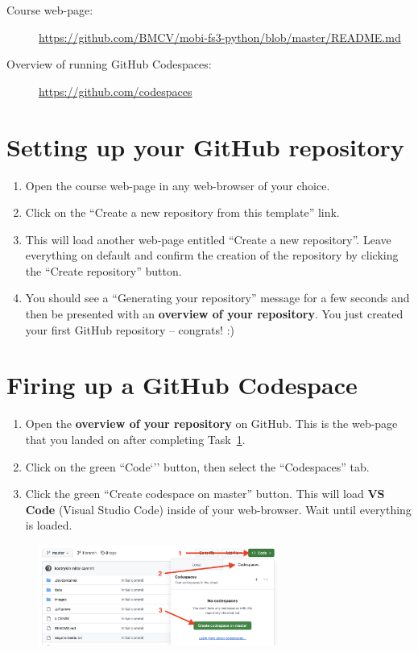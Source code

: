 \documentclass[12pt,a4paper]{article}
\begin{document}
\begin{description}
\item[Course web-page:] \begin{sloppypar}\url{https://github.com/BMCV/mobi-fs3-python/blob/master/README.md}\end{sloppypar}
\item[Overview of running GitHub Codespaces:] \url{https://github.com/codespaces}
\end{description}

\section{Setting up your GitHub repository}
\label{task:preparation}
\begin{enumerate}
\item Open the course web-page in any web-browser of your choice.
\item Click on the ``Create a new repository from this template'' link.
\item This will load another web-page entitled ``Create a new repository''. Leave everything on default and confirm the creation of the repository by clicking the ``Create repository'' button.
\item You should see a ``Generating your repository'' message for a few seconds and then be presented with an \textbf{overview of your repository}. You just created your first GitHub repository -- congrats! :)
\end{enumerate}

\section{Firing up a GitHub Codespace}
\label{task:codespaces}
\begin{enumerate}
\item Open the \textbf{overview of your repository} on GitHub. This is the web-page that you landed on after completing Task~\ref{task:preparation}.
\item Click on the green ``Code`'' button, then select the ``Codespaces'' tab.
\item Click the green ``Create codespace on master'' button. This will load \textbf{VS Code} (Visual Studio Code) inside of your web-browser. Wait until everything is loaded.
\end{enumerate}

\begin{figure}[h!]
    \centering
    \includegraphics[width=0.7\textwidth]{images/codespaces.png}
\end{figure}
\end{document}
